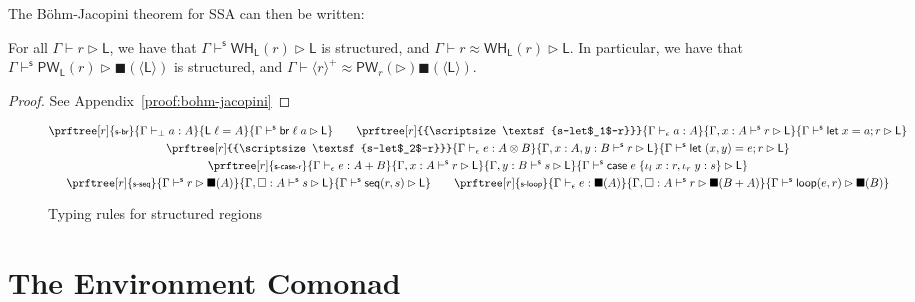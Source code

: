 \documentclass[acmsmall,screen,review]{acmart}
\newcommand{\ms}[1]{\ensuremath{\mathsf{#1}}}
\newcommand{\lto}{:}
\newcommand{\linl}[1]{\iota_l\;{#1}}
\newcommand{\linr}[1]{\iota_r\;{#1}}
\newcommand{\letstmt}[3]{\ensuremath{\ms{let}\;#1 = #2; #3}}
\newcommand{\brb}[2]{\ms{br}\;#1\;#2}
\newcommand{\casestmt}[5]{\ms{case}\;#1\;\{\linl{#2} \lto #3, \linr{#4} \lto #5\}}
\newcommand{\bhyp}[2]{#1 : #2}
\newcommand{\rle}[1]{{\scriptsize\textsf{#1}}}
\newcommand{\hasty}[4]{#1 \vdash_{#2} #3: {#4}}
\newcommand{\haslb}[3]{#1 \vdash #2 \rhd #3}
\newcommand{\shaslb}[3]{#1 \vdash^{\ms{s}} #2 \rhd #3}
\newcommand{\teqv}{\approx}
\newcommand{\lbeq}[4]{#1 \vdash #2 \teqv #3 \rhd {#4}}
\newcommand{\towhile}[2]{\ms{WH}_{#1}(#2)}
\newcommand{\topwhile}[2]{\ms{PW}_{#1}(#2)}
\newcommand{\invar}{\square}
\newcommand{\outlb}{\blacksquare}
\newcommand{\pckd}[1]{\langle #1 \rangle}
\begin{document}
The B\"ohm-Jacopini theorem for SSA can then
be written:
\begin{theorem}[name=B\"ohm-Jacopini for SSA, restate=bohmjacopini]
  For all $\haslb{\Gamma}{r}{\ms{L}}$, we have that $\shaslb{\Gamma}{\towhile{\ms{L}}{r}}{\ms{L}}$
  is structured, and $\lbeq{\Gamma}{r}{\towhile{\ms{L}}{r}}{\ms{L}}$. In particular, we have that
  $\shaslb{\Gamma}{\topwhile{\ms{L}}{r}}{\outlb(\pckd{\ms{L}})}$ is structured, and
  $\lbeq{\Gamma}{\pckd{r}^+}{\topwhile{r}}{\outlb(\pckd{\ms{L}})}$.
\end{theorem}
\begin{proof}
  See Appendix~\ref{proof:bohm-jacopini}
\end{proof}

\begin{figure}
  \begin{gather*}
    \prftree[r]{\rle{s-br}}{\hasty{\Gamma}{\bot}{a}{A}}{\ms{L}\;\ell = A}
      {\shaslb{\Gamma}{\brb{\ell}{a}}{\ms{L}}} \qquad
    \prftree[r]{\rle{s-let$_1$-r}}
      {\hasty{\Gamma}{\epsilon}{a}{A}}
      {\shaslb{\Gamma, \bhyp{x}{A}}{r}{\ms{L}}}
      {\shaslb{\Gamma}{\letstmt{x}{a}{r}}{\ms{L}}} \\
    \prftree[r]{\rle{s-let$_2$-r}}
      {\hasty{\Gamma}{\epsilon}{e}{A \otimes B}}
      {\shaslb{\Gamma, \bhyp{x}{A}, \bhyp{y}{B}}{r}{\ms{L}}}
      {\shaslb{\Gamma}{\letstmt{(x, y)}{e}{r}}{\ms{L}}} \\
    \prftree[r]{\rle{s-case-r}}
      {\hasty{\Gamma}{\epsilon}{e}{A + B}}
      {\shaslb{\Gamma, \bhyp{x}{A}}{r}{\ms{L}}}
      {\shaslb{\Gamma, \bhyp{y}{B}}{s}{\ms{L}}}
      {\shaslb{\Gamma}{\casestmt{e}{x}{r}{y}{s}}{\ms{L}}} \\
    \prftree[r]{\rle{s-seq}}
      {\shaslb{\Gamma}{r}{\outlb(A)}}
      {\shaslb{\Gamma, \bhyp{\invar}{A}}{s}{\ms{L}}}
      {\shaslb{\Gamma}{\ms{seq}(r, s)}{\ms{L}}} \qquad
    \prftree[r]{\rle{s-loop}}
      {\hasty{\Gamma}{\epsilon}{e}{\outlb(A)}}
      {\shaslb{\Gamma, \bhyp{\invar}{A}}{r}{\outlb(B + A)}}
      {\shaslb{\Gamma}{\ms{loop}(e, r)}{\outlb(B)}}
  \end{gather*}
  \caption{Typing rules for structured regions}
  \Description{}
  \label{fig:structured-regions}
\end{figure}

\section{The Environment Comonad}

\label{apx:environment}
\end{document}
